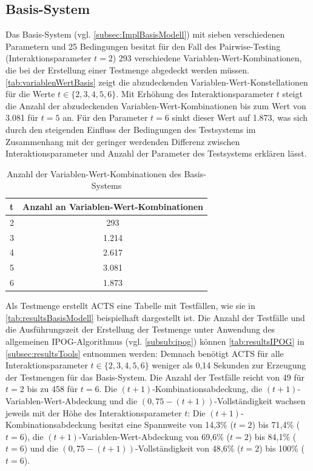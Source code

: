 \subsection{Basis-System}\label{subsec:resultsBasisModell}

Das Basis-System (vgl. \autoref{subsec:ImplBasisModell}) mit sieben verschiedenen Parametern und 25 Bedingungen besitzt für den Fall des Pairwise-Testing (Interaktionsparameter $t=2$) 293 verschiedene Variablen-Wert-Kombinationen, die bei der Erstellung einer Testmenge abgedeckt werden müssen. \autoref{tab:variablenWertBasis} zeigt die abzudeckenden Variablen-Wert-Konstellationen für die Werte $t \in \{2,3,4,5,6\}$. Mit Erhöhung des Interaktionsparameter $t$ steigt die Anzahl der abzudeckenden Variablen-Wert-Kombinationen bis zum Wert von 3.081 für $t=5$ an. Für den Parameter $t=6$ sinkt dieser Wert auf 1.873, was sich durch den steigenden Einfluss der Bedingungen des Testsystems im Zusammenhang mit der geringer werdenden Differenz zwischen Interaktionsparameter und Anzahl der Parameter des Testsystems erklären lässt.

\renewcommand{\arraystretch}{2}
\begin{table}[!htb]
\footnotesize
\begin{tabular}{|M{0.1\textwidth}|c|}
\hline
{}t & Anzahl an Variablen-Wert-Kombinationen \\  & 293                                    \\  & 1.214                                   \\  & 2.617                                   \\  & 3.081                                   \\  & 1.873                                   \\ \hline
\end{tabular}
\normalsize
\caption{Anzahl der Variablen-Wert-Kombinationen des Basis-Systems}
\label{tab:variablenWertBasis}
\end{table}
\renewcommand{\arraystretch}{1.5}

Als Testmenge erstellt ACTS eine Tabelle mit Testfällen, wie sie in \autoref{tab:resultsBasisModell} beispielhaft dargestellt ist. Die Anzahl der Testfälle und die Ausführungszeit der Erstellung der Testmenge unter Anwendung des allgemeinen IPOG-Algorithmus (vgl. \autoref{subsub:ipog}) können \autoref{tab:resultsIPOG} in \autoref{subsec:resultsTools} entnommen werden: Demnach benötigt ACTS für alle Interaktionsparameter $t \in \{2,3,4,5,6\}$ weniger als 0,14 Sekunden zur Erzeugung der Testmengen für das Basis-System. Die Anzahl der Testfälle reicht von 49 für $t=2$ bis zu 458 für $t=6$. Die $(t+1)$-Kombinationsabdeckung, die $(t+1)$-Variablen-Wert-Abdeckung und die $(0,75-(t+1))$-Vollständigkeit wachsen jeweils mit der Höhe des Interaktionsparameter $t$: Die $(t+1)$-Kombinationsabdeckung besitzt eine Spannweite von 14,3\% ($t=2$) bis 71,4\% ($t=6$), die $(t+1)$-Variablen-Wert-Abdeckung von 69,6\% ($t=2$) bis 84,1\% ($t=6$) und die $(0,75-(t+1))$-Vollständigkeit von 48,6\% ($t=2$) bis 100\% ($t=6$).


